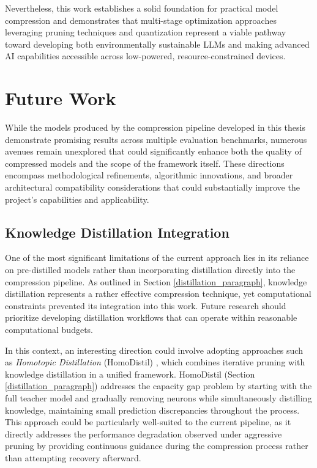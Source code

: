 Nevertheless, this work establishes a solid foundation for practical model compression and demonstrates that multi-stage optimization approaches leveraging pruning techniques and quantization represent a viable pathway toward developing both environmentally sustainable LLMs and making advanced AI capabilities accessible across low-powered, resource-constrained devices.

\section{Future Work}

While the models produced by the compression pipeline developed in this thesis demonstrate promising results across multiple evaluation benchmarks, numerous avenues remain unexplored that could significantly enhance both the quality of compressed models and the scope of the framework itself. These directions encompass methodological refinements, algorithmic innovations, and broader architectural compatibility considerations that could substantially improve the project's capabilities and applicability.

\subsection{Knowledge Distillation Integration}

One of the most significant limitations of the current approach lies in its reliance on pre-distilled models rather than incorporating distillation directly into the compression pipeline. As outlined in Section \ref{distillation_paragraph}, knowledge distillation represents a rather effective compression technique, yet computational constraints prevented its integration into this work. Future research should prioritize developing distillation workflows that can operate within reasonable computational budgets.

In this context, an interesting direction could involve adopting approaches such as \textit{Homotopic Distillation} (HomoDistil) \cite{homodistil}, which combines iterative pruning with knowledge distillation in a unified framework. HomoDistil (Section \ref{distillation_paragraph}) addresses the capacity gap problem by starting with the full teacher model and gradually removing neurons while simultaneously distilling knowledge, maintaining small prediction discrepancies throughout the process. This approach could be particularly well-suited to the current pipeline, as it directly addresses the performance degradation observed under aggressive pruning by providing continuous guidance during the compression process rather than attempting recovery afterward.

